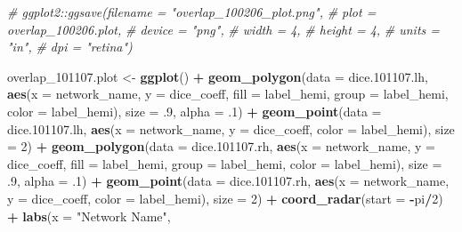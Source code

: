 \documentclass[
]{article}
\newenvironment{Shaded}{\begin{snugshade}}{\end{snugshade}}
\newcommand{\CommentTok}[1]{\textcolor[rgb]{0.56,0.35,0.01}{\textit{#1}}}
\newcommand{\DataTypeTok}[1]{\textcolor[rgb]{0.13,0.29,0.53}{#1}}
\newcommand{\DecValTok}[1]{\textcolor[rgb]{0.00,0.00,0.81}{#1}}
\newcommand{\FloatTok}[1]{\textcolor[rgb]{0.00,0.00,0.81}{#1}}
\newcommand{\KeywordTok}[1]{\textcolor[rgb]{0.13,0.29,0.53}{\textbf{#1}}}
\newcommand{\NormalTok}[1]{#1}
\newcommand{\OperatorTok}[1]{\textcolor[rgb]{0.81,0.36,0.00}{\textbf{#1}}}
\newcommand{\StringTok}[1]{\textcolor[rgb]{0.31,0.60,0.02}{#1}}
\begin{document}
\begin{Shaded}
\begin{Highlighting}[]
\CommentTok{# ggplot2::ggsave(filename = "overlap_100206_plot.png",}
\CommentTok{#                 plot = overlap_100206.plot,}
\CommentTok{#                 device = "png",}
\CommentTok{#                 width = 4,}
\CommentTok{#                 height = 4, }
\CommentTok{#                 units = "in",}
\CommentTok{#                 dpi = "retina")}


\NormalTok{overlap_}\FloatTok{101107.}\NormalTok{plot <-}\StringTok{ }\KeywordTok{ggplot}\NormalTok{() }\OperatorTok{+}\StringTok{  }
\StringTok{  }\KeywordTok{geom_polygon}\NormalTok{(}\DataTypeTok{data =}\NormalTok{ dice.}\FloatTok{101107.}\NormalTok{lh, }\KeywordTok{aes}\NormalTok{(}\DataTypeTok{x =}\NormalTok{ network_name, }\DataTypeTok{y =}\NormalTok{ dice_coeff, }\DataTypeTok{fill =}\NormalTok{ label_hemi, }\DataTypeTok{group =}
\NormalTok{                                            label_hemi, }\DataTypeTok{color =}\NormalTok{ label_hemi), }\DataTypeTok{size =} \FloatTok{.9}\NormalTok{, }\DataTypeTok{alpha =} \FloatTok{.1}\NormalTok{) }\OperatorTok{+}
\StringTok{  }\KeywordTok{geom_point}\NormalTok{(}\DataTypeTok{data =}\NormalTok{ dice.}\FloatTok{101107.}\NormalTok{lh, }\KeywordTok{aes}\NormalTok{(}\DataTypeTok{x =}\NormalTok{ network_name, }\DataTypeTok{y =}\NormalTok{ dice_coeff, }\DataTypeTok{color =}\NormalTok{ label_hemi), }\DataTypeTok{size =} \DecValTok{2}\NormalTok{) }\OperatorTok{+}\StringTok{ }
\StringTok{  }\KeywordTok{geom_polygon}\NormalTok{(}\DataTypeTok{data =}\NormalTok{ dice.}\FloatTok{101107.}\NormalTok{rh, }\KeywordTok{aes}\NormalTok{(}\DataTypeTok{x =}\NormalTok{ network_name, }\DataTypeTok{y =}\NormalTok{ dice_coeff, }\DataTypeTok{fill =}\NormalTok{ label_hemi, }\DataTypeTok{group =}
\NormalTok{                                            label_hemi, }\DataTypeTok{color =}\NormalTok{ label_hemi), }\DataTypeTok{size =} \FloatTok{.9}\NormalTok{, }\DataTypeTok{alpha =} \FloatTok{.1}\NormalTok{) }\OperatorTok{+}
\StringTok{  }\KeywordTok{geom_point}\NormalTok{(}\DataTypeTok{data =}\NormalTok{ dice.}\FloatTok{101107.}\NormalTok{rh, }\KeywordTok{aes}\NormalTok{(}\DataTypeTok{x =}\NormalTok{ network_name, }\DataTypeTok{y =}\NormalTok{ dice_coeff, }\DataTypeTok{color =}\NormalTok{ label_hemi), }\DataTypeTok{size =} \DecValTok{2}\NormalTok{) }\OperatorTok{+}\StringTok{ }
\StringTok{  }\KeywordTok{coord_radar}\NormalTok{(}\DataTypeTok{start =} \OperatorTok{-}\NormalTok{pi}\OperatorTok{/}\DecValTok{2}\NormalTok{) }\OperatorTok{+}
\StringTok{  }\KeywordTok{labs}\NormalTok{(}\DataTypeTok{x =} \StringTok{"Network Name"}\NormalTok{,}

\end{Highlighting}
\end{Shaded}
\end{document}
